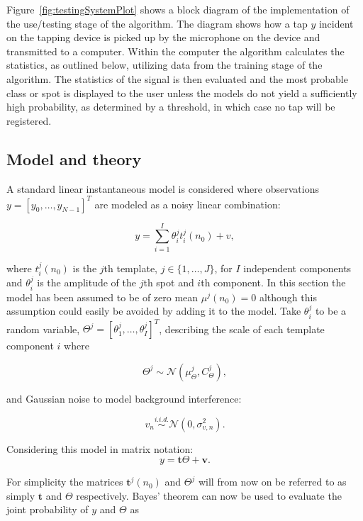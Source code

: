 Figure~\ref{fig:testingSystemPlot} shows a block diagram of the implementation of the use/testing stage of the algorithm. The diagram shows how a tap $y$ incident on the tapping device is picked up by the microphone on the device and transmitted to a computer. Within the computer the algorithm calculates the statistics, as outlined below, utilizing data from the training stage of the algorithm. The statistics of the signal is then evaluated and the most probable class or spot is displayed to the user unless the models do not yield a sufficiently high probability, as determined by a threshold, in which case no tap will be registered.

\subsection{Model and theory}
A standard linear instantaneous model is considered where observations $y = [y_0, \ldots , y_{N-1}]^T $ are modeled as a noisy linear combination:

\begin{equation}\label{eq:mod1}
y = \sum_{i=1}^{I} \theta_i^j t_i^j(n_0) + v,
\end{equation}

where $t_i^j(n_0)$ is the $j$th template, $j \in \{1, \ldots ,J\}$, for $I$ independent components and $\theta_i^j$ is the amplitude of the $j$th spot and $i$th component. In this section the model has been assumed to be of zero mean $\mu^j(n_0) =0$ although this assumption could easily be avoided by adding it to the model. Take $\theta_i^j$ to be a random variable, $\Theta^j = [\theta_1^j,\ldots,\theta_I^j]^T$, describing the scale of each template component $i$ where

\begin{equation}\label{eq:theta}
\Theta^j \sim \mathcal{N}(\mu_{\Theta}^j,C_{\Theta}^j),
\end{equation}

and Gaussian noise to model background interference:

\begin{equation}\label{eq:noise}
v_n \stackrel{i.i.d.}{\sim} \mathcal{N}(0,\sigma_{v,n}^2).
\end{equation}

Considering this model in matrix notation:
\begin{equation}\label{eq:mod2}
y = \textbf{t}\Theta + \textbf{v}.
\end{equation}

For simplicity the matrices $\textbf{t}^j(n_0)$ and $\Theta^j$ will from now on be referred to as simply $\textbf{t}$ and $\Theta$ respectively.
Bayes' theorem can now be used to evaluate the joint probability of $y$ and $\Theta$ as

